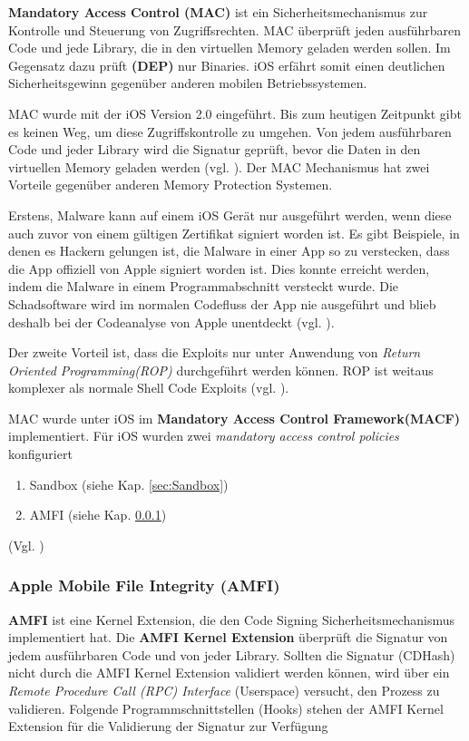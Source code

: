  \textbf{Mandatory Access Control (MAC)} ist ein Sicherheitsmechanismus zur Kontrolle und Steuerung von Zugriffsrechten. MAC überprüft jeden ausführbaren Code und jede Library, die in den virtuellen Memory geladen werden sollen. Im Gegensatz dazu prüft \textbf{  (DEP)} nur Binaries. iOS erfährt somit einen deutlichen Sicherheitsgewinn gegenüber anderen mobilen Betriebssystemen. \par 
 MAC wurde mit der iOS Version 2.0 eingeführt. Bis zum heutigen Zeitpunkt gibt es keinen Weg, um diese Zugriffskontrolle zu umgehen. Von jedem ausführbaren Code und jeder Library wird die Signatur geprüft, bevor die Daten in den virtuellen Memory geladen werden (vgl. \cite{iOSSec[5], Hacking[1]}).
Der MAC Mechanismus hat zwei Vorteile gegenüber anderen Memory Protection Systemen. \par 
Erstens, Malware kann auf einem iOS Gerät nur ausgeführt werden, wenn diese auch zuvor von einem gültigen Zertifikat signiert worden ist. Es gibt Beispiele, in denen es Hackern gelungen ist, die Malware in einer App so zu verstecken, dass die App offiziell von Apple signiert worden ist. Dies konnte erreicht werden, indem die Malware in einem Programmabschnitt versteckt wurde. Die Schadsoftware wird im normalen Codefluss der App nie ausgeführt und blieb deshalb bei der Codeanalyse von Apple unentdeckt (vgl. \cite{iOSSec[5], Hacking[1]}). \par 

 Der zweite Vorteil ist, dass die Exploits nur unter Anwendung von \textit{ \glqq Return Oriented Programming(ROP)\grqq{} } durchgeführt werden können. ROP ist weitaus komplexer als normale Shell Code Exploits (vgl. \cite{Architecture[1], Architecture[2], Architecture[3], ROP[1], ROP[2], iOSSec[5], Hacking[1]}).

MAC wurde unter iOS im \textbf{Mandatory Access Control Framework(MACF)} implementiert. Für iOS wurden zwei \textit{\glqq mandatory access control policies\grqq{}} konfiguriert
\begin{enumerate}
   \item Sandbox (siehe Kap. \ref{sec:Sandbox})
   \item AMFI (siehe Kap. \ref{sec:AMFI})
\end{enumerate}
(Vgl. \cite{iOSSec[5], Hacking[1]})
\subsubsection{Apple Mobile File Integrity (AMFI)}
\label{sec:AMFI}
\textbf{AMFI } ist eine Kernel Extension, die den Code Signing Sicherheitsmechanismus implementiert hat. Die \textbf{AMFI Kernel Extension} überprüft die Signatur von jedem ausführbaren Code und von jeder Library. Sollten die Signatur (CDHash) nicht durch die AMFI Kernel Extension validiert werden können, wird über ein \textit{\glqq Remote Procedure Call (RPC) Interface\grqq{}} (Userspace) versucht, den Prozess zu validieren. Folgende Programmschnittstellen (Hooks) stehen der AMFI Kernel Extension für die Validierung der Signatur zur Verfügung

